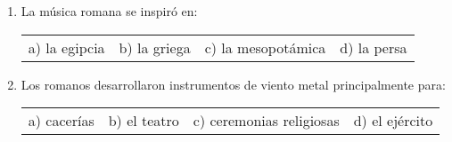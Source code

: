 \documentclass[letterpaper,12pt,notitlepage,spanish]{article}
\begin{document}
%
%
\begin{ejercicio}
	\begin{enumerate}
%
%
	\item La música romana se inspiró en: \par
%
	\begin{tabular}{llll}
		a) la egipcia & b) la griega  & c) la mesopotámica & d) la persa \\
	\end{tabular}

%
%
%
	\item Los romanos desarrollaron instrumentos de viento metal principalmente para: \par
%
%		
	\begin{tabular}{llll}
		a) cacerías & b) el teatro & c) ceremonias religiosas & d) el ejército  \\
	\end{tabular}

%
%
	\end{enumerate}
\end{ejercicio}
%
%
\end{document}
